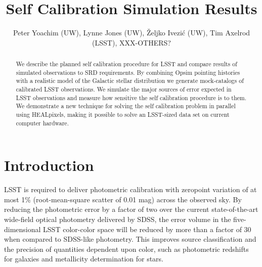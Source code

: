 \documentclass[12pt,preprint]{aastex}
\begin{document}
\title{Self Calibration Simulation Results}
\author{Peter Yoachim (UW), Lynne Jones (UW),
\v{Z}eljko Ivezi\'{c} (UW), Tim Axelrod (LSST), XXX-OTHERS?}

\begin{abstract}
We describe the planned self calibration procedure for LSST and compare results of simulated observations to SRD requirements.  By combining Opsim pointing histories with a realistic model of the Galactic stellar distribution we generate mock-catalogs of calibrated LSST observations.  We simulate the major sources of error expected in LSST observations and measure how sensitive the self calibration procedure is to them.  We demonstrate a new technique for solving the self calibration problem in parallel using HEALpixels, making it possible to solve an LSST-sized data set on current computer hardware.
\end{abstract}


\section{Introduction}


LSST is required to deliver photometric calibration with zeropoint
variation of at most 1\% (root-mean-square scatter of 0.01 mag) across
the observed sky.  By reducing the photometric error by a factor of
two over the current state-of-the-art wide-field optical photometry
delivered by SDSS, the error volume in the five-dimensional LSST
color-color space will be reduced by more than a factor of 30 when
compared to SDSS-like photometry. This improves source classification
and the precision of quantities dependent upon color, such as
photometric redshifts for galaxies and metallicity determination for
stars.
\end{document}
